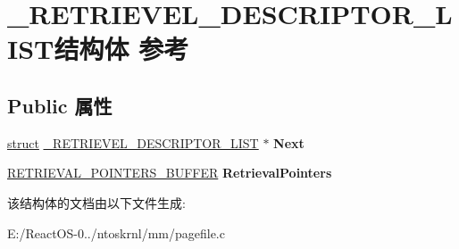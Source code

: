 \hypertarget{struct___r_e_t_r_i_e_v_e_l___d_e_s_c_r_i_p_t_o_r___l_i_s_t}{}\section{\+\_\+\+R\+E\+T\+R\+I\+E\+V\+E\+L\+\_\+\+D\+E\+S\+C\+R\+I\+P\+T\+O\+R\+\_\+\+L\+I\+S\+T结构体 参考}
\label{struct___r_e_t_r_i_e_v_e_l___d_e_s_c_r_i_p_t_o_r___l_i_s_t}
\subsection*{Public 属性}
\begin{DoxyCompactItemize}
\item 
\mbox{\label{struct___r_e_t_r_i_e_v_e_l___d_e_s_c_r_i_p_t_o_r___l_i_s_t_a2191d8b24af002c70eb5dc69dd96557b}} 
\hyperlink{interfacestruct}{struct} \hyperlink{struct___r_e_t_r_i_e_v_e_l___d_e_s_c_r_i_p_t_o_r___l_i_s_t}{\+\_\+\+R\+E\+T\+R\+I\+E\+V\+E\+L\+\_\+\+D\+E\+S\+C\+R\+I\+P\+T\+O\+R\+\_\+\+L\+I\+ST} $\ast$ {\bfseries Next}
\item 
\mbox{\label{struct___r_e_t_r_i_e_v_e_l___d_e_s_c_r_i_p_t_o_r___l_i_s_t_a78b0c33217172aa6df9ca0b3ab2c45e9}} 
\hyperlink{struct_r_e_t_r_i_e_v_a_l___p_o_i_n_t_e_r_s___b_u_f_f_e_r}{R\+E\+T\+R\+I\+E\+V\+A\+L\+\_\+\+P\+O\+I\+N\+T\+E\+R\+S\+\_\+\+B\+U\+F\+F\+ER} {\bfseries Retrieval\+Pointers}
\end{DoxyCompactItemize}


该结构体的文档由以下文件生成\+:\begin{DoxyCompactItemize}
\item 
E\+:/\+React\+O\+S-\/0../ntoskrnl/mm/pagefile.\+c\end{DoxyCompactItemize}

